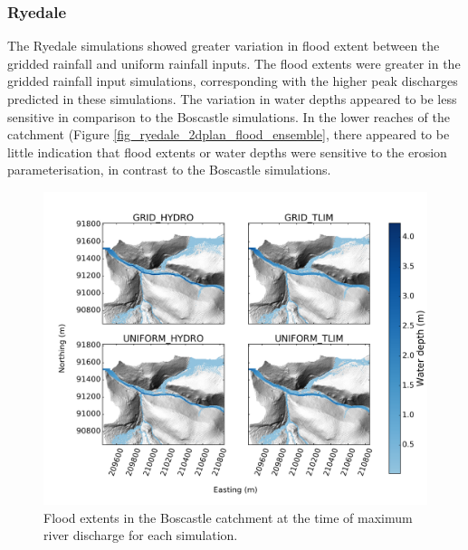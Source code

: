 \subsubsection{Ryedale}
The Ryedale simulations showed greater variation in flood extent between the gridded rainfall and uniform rainfall inputs. The flood extents were greater in the gridded rainfall input simulations, corresponding with the higher peak discharges predicted in these simulations.  The variation in water depths appeared to be less sensitive in comparison to the Boscastle simulations. In the lower reaches of the catchment (Figure \ref{fig_ryedale_2dplan_flood_ensemble}, there appeared to be little indication that flood extents or water depths were sensitive to the erosion parameterisation, in contrast to the Boscastle simulations.



\begin{figure}
\includegraphics[width=20cm]{chp06_figures_scripts/figure_boscastle_peak_flood_ensemble.png}
\caption{Flood extents in the Boscastle catchment at the time of maximum river discharge for each simulation.}
\label{fig_boscastle_2dplan_flood_ensemble}
\end{figure}

